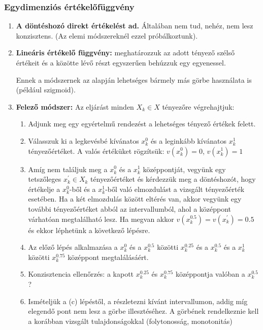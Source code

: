 \documentclass[a4paper,12pt]{article}
\begin{document}
\subsubsection{Egydimenziós értékelőfüggvény}
\label{sssec:1D}
\begin{enumerate}

\item \textbf{A döntéshozó direkt értékelést ad.} Általában nem tud, nehéz, nem lesz konzisztens. (Az elemi módszereknél ezzel próbálkoztunk).

\item \textbf{Lineáris értékelő függvény:} meghatározzuk az adott tényező szélső értékeit és a közötte lévő részt egyszerűen behúzzuk egy egyenessel.

Ennek a módszernek az alapján lehetséges bármely más görbe használata is (például szigmoid).

\item \textbf{Felező módszer:}
Az eljárást minden $X_k \in X$ tényezőre végrehajtjuk:
\begin{enumerate}
\item Adjunk meg egy egyértelmű rendezést a lehetséges tényező értékek felett.
\item Válasszuk ki a legkevésbé kívánatos $x^0_k $ és a leginkább kívánatos $x^1_k$ tényezőértéket. A valós értéküket rögzítsük: $v(x^0_k) = 0 $, $v(x^1_k) = 1$
\item Amíg nem találjuk meg a $x^0_k$ és a $x^1_k$ középpontját, vegyünk egy tetszőleges $x^\prime_k \in X_k$ tényezőértéket és kérdezzük meg a döntéshozót, hogy értékelje a $x^0_k$-ből és a $x^1_k$-ből való elmozdulást a vizsgált tényezőérték esetében. Ha a két elmozdulás között eltérés van, akkor vegyünk egy további tényezőértéket abból az intervallumból, ahol a középpont várhatóan megtalálható lesz. Ha megvan akkor $ v(x^{0.5}_k) = v(x^{\prime}_k) = 0.5$ és ekkor léphetünk a következő lépésre.
\item Az előző lépés alkalmazása a $x^0_k$ és a $x^{0.5}_k$ közötti $x^{0.25}_k$ és a $x^{0.5}_k$ és a $x^1_k$ közötti $x^{0.75}_k$ középpont megtalálásáért.
\item Konzisztencia ellenőrzés: a kapott $x^{0.25}_k$ és $x^{0.75}_k$ középpontja valóban a $x^{0.5}_k$?
\item Ismételjük a (c) lépéstől, a részletezni kívánt intervallumon, addig míg elegendő pont nem lesz a görbe illesztéséhez. A görbének rendelkeznie kell a korábban vizsgált tulajdonságokkal (folytonosság, monotonitás)
\end{enumerate}

\end{enumerate}
\end{document}
